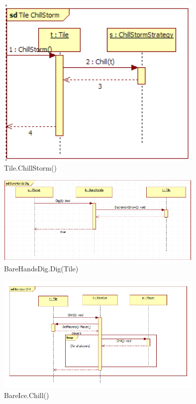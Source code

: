 \begin{figure}[H]
	\begin{center}
		\includegraphics[width=10cm]{chapters/chapter03/seqdiag/Tile_ChillStorm.png}
		\caption{Tile.ChillStorm()}
		\label{fig:TileChillStorm}
	\end{center}
\end{figure}
\begin{figure}[H]
	\begin{center}
		\includegraphics[width=10cm]{chapters/chapter03/seqdiag/BareHandsDig_Dig.png}
		\caption{BareHandsDig.Dig(Tile)}
		\label{fig:BareHandsDig.Dig}
	\end{center}
\end{figure}
\begin{figure}[H]
	\begin{center}
		\includegraphics[width=10cm]{chapters/chapter03/seqdiag/BareIce_Chill.png}
		\caption{BareIce.Chill()}
		\label{fig:BareIceChill}
	\end{center}
\end{figure}
